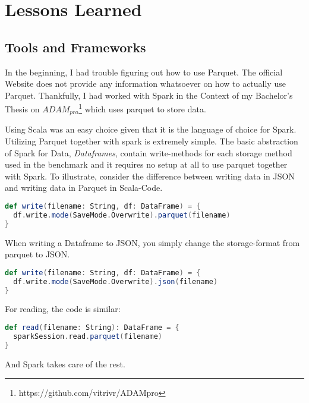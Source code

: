 \section{Lessons Learned} \label{sec:lessons_learned}

\subsection{Tools and Frameworks}
In the beginning, I had trouble figuring out how to use Parquet.
The official Website does not provide any information whatsoever on how to actually use Parquet.
Thankfully, I had worked with Spark in the Context of my Bachelor's Thesis on $ADAM_{pro}$\footnote{https://github.com/vitrivr/ADAMpro} which uses parquet to store data.

Using Scala was an easy choice given that it is the language of choice for Spark.
Utilizing Parquet together with spark is extremely simple.
The basic abstraction of Spark for Data, \textit{Dataframes}, contain write-methods for each storage method used in the benchmark and it requires no setup at all to use parquet together with Spark.
To illustrate, consider the difference between writing data in JSON and writing data in Parquet in Scala-Code.

\renewcommand{\lstlistingname}{Code}

\begin{lstlisting}[language=Scala,caption=Saving a Dataframe with Parquet, label=amb, captionpos=b]
def write(filename: String, df: DataFrame) = {
  df.write.mode(SaveMode.Overwrite).parquet(filename)
}
\end{lstlisting}

When writing a Dataframe to JSON, you simply change the storage-format from parquet to JSON.

\begin{lstlisting}[language=Scala,caption=Saving a Dataframe with JSON, label=amb, captionpos=b]
def write(filename: String, df: DataFrame) = {
  df.write.mode(SaveMode.Overwrite).json(filename)
}
\end{lstlisting}

For reading, the code is similar:

\begin{lstlisting}[language=Scala,caption=Reading a Dataframe with Parquet, label=amb, captionpos=b]
def read(filename: String): DataFrame = {
  sparkSession.read.parquet(filename)
}
\end{lstlisting}

And Spark takes care of the rest.

